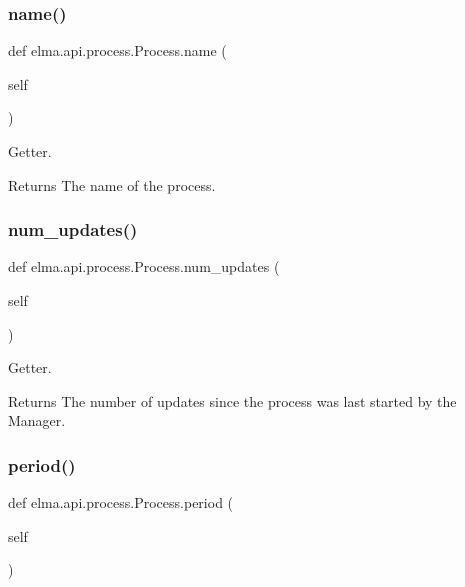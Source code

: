 \subsubsection{\texorpdfstring{name()}{name()}}
{\footnotesize\ttfamily def elma.\+api.\+process.\+Process.\+name (\begin{DoxyParamCaption}\item[{}]{self }\end{DoxyParamCaption})}



Getter. 

\begin{DoxyReturn}{Returns}
The name of the process. 
\end{DoxyReturn}
\mbox{\label{classelma_1_1api_1_1process_1_1Process_ad0a58ddb9103ec226c42892e5a3d2c3f}} 
\subsubsection{\texorpdfstring{num\+\_\+updates()}{num\_updates()}}
{\footnotesize\ttfamily def elma.\+api.\+process.\+Process.\+num\+\_\+updates (\begin{DoxyParamCaption}\item[{}]{self }\end{DoxyParamCaption})}



Getter. 

\begin{DoxyReturn}{Returns}
The number of updates since the process was last started by the Manager. 
\end{DoxyReturn}
\mbox{\label{classelma_1_1api_1_1process_1_1Process_a8e37ba949b3285fe52ca8638cdcb0bb9}} 
\subsubsection{\texorpdfstring{period()}{period()}}
{\footnotesize\ttfamily def elma.\+api.\+process.\+Process.\+period (\begin{DoxyParamCaption}\item[{}]{self }\end{DoxyParamCaption})}



